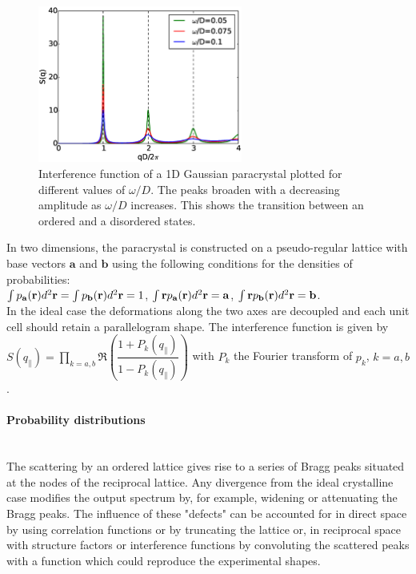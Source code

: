 \begin{figure}[ht]
\begin{center}
\includegraphics[width=0.6\textwidth]{fig/funcplot/S_q_1Dparacrystal.eps}
\end{center}
\caption{Interference function of a 1D Gaussian paracrystal plotted for different values of $\omega /D$. The peaks broaden with a decreasing amplitude as $\omega/D$ increases. This shows the transition between an ordered and a disordered states. }
\label{fig:1dparas_q}
\end{figure}

In two dimensions, the paracrystal is constructed on a pseudo-regular lattice with base vectors $\mathbf{a}$ and $\mathbf{b}$ using the following conditions for the densities of probabilities:\\ $\int p_{\mathbf{a}}(\mathbf{r})d^2\mathbf{r}=\int p_{\mathbf{b}}(\mathbf{r})d^2\mathbf{r}=1$, $\int \mathbf{r} p_{\mathbf{a}}(\mathbf{r})d^2\mathbf{r}=\mathbf{a}$, $\int \mathbf{r} p_{\mathbf{b}}(\mathbf{r})d^2\mathbf{r}=\mathbf{b}$.\\
In the ideal case the deformations along the two axes are decoupled and each unit cell should retain a parallelogram shape. The interference function is given by\\ $S(q_{\parallel})=\prod_{k=a,b}\Re\left(\dfrac{1+P_k(q_{\parallel})}{1-P_k(q_{\parallel})} \right)$ with $P_k$ the Fourier transform of $p_k$, $k=a, b$.

\paragraph{Probability distributions} \mbox{}\\
The scattering by an ordered lattice gives rise to a series of Bragg peaks situated at the nodes of the reciprocal lattice. Any divergence from the ideal crystalline case modifies the output spectrum by, for example, widening or attenuating the Bragg peaks. The influence of these "defects" can be accounted for 
 in direct space by using correlation functions or by truncating the lattice or, in reciprocal space with structure factors or interference functions by convoluting the scattered peaks with a function which could reproduce the experimental shapes.



